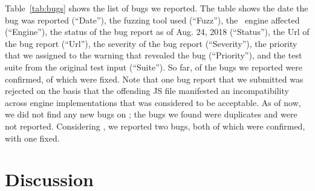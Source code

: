 \documentclass[10pt,conference,anonymous]{IEEEtran}
\begin{document}
Table~\ref{tab:bugs} shows the list of bugs we reported. The table
shows the date the bug was reported (``Date''), the fuzzing tool used
(``Fuzz''), the \js\ engine affected (``Engine''), the status of the
bug report as of Aug. 24, 2018 (``Status''), the Url of the bug report
(``Url''), the severity of the bug report (``Severity''), the priority
that we assigned to the warning that revealed the bug (``Priority''),
and the test suite from the original test input (``Suite''). So far,
\noDiffConfirmed{} of the bugs we reported were confirmed, \noDiffFixed{} of which
were fixed. Note that one bug report that we submitted was rejected on
the basis that the offending JS file manifested an incompatibility
across engine implementations that was considered to be acceptable. As
of now, we did not find any new bugs on \smonkey{}; the bugs we found
were duplicates and were not reported. Considering \veight{}, we reported two
bugs, both of which were confirmed, with one fixed.





\begin{center}
\end{center}


\section{Discussion}
\label{sec:bugs}
\end{document}
